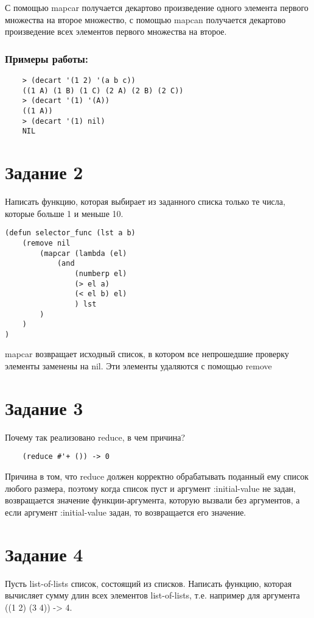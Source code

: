 \documentclass[a4paper, 12pt]{article}
\begin{document}
С помощью mapcar получается декартово произведение одного элемента первого множества на второе множество, с помощью mapcan получается декартово произведение всех элементов первого множества на второе.

\subsubsection*{Примеры работы:}
\begin{lstlisting}
	> (decart '(1 2) '(a b c))
	((1 A) (1 B) (1 C) (2 A) (2 B) (2 C))
	> (decart '(1) '(A))
	((1 A))
	> (decart '(1) nil)
	NIL
\end{lstlisting}


\section*{Задание 2}
Написать функцию, которая выбирает из заданного списка только те числа, которые больше 1 и меньше 10.

\begin{lstlisting}
(defun selector_func (lst a b)
	(remove nil 
		(mapcar (lambda (el) 
			(and 
				(numberp el) 
				(> el a) 
				(< el b) el)
				) lst
		)
	)
)

\end{lstlisting}
mapcar возвращает исходный список, в котором все непрошедшие проверку элементы заменены на nil. Эти элементы удаляются с помощью remove


\section*{Задание 3}
Почему так реализовано reduce, в чем причина?
\begin{lstlisting}
	(reduce #'+ ()) -> 0
\end{lstlisting}

Причина в том, что reduce должен корректно обрабатывать поданный ему список любого размера, поэтому когда список пуст и аргумент :initial-value не задан,  возвращается значение функции-аргумента, которую вызвали без аргументов, а если аргумент :initial-value задан, то возвращается его значение.




\section*{Задание 4}
Пусть list-of-lists список, состоящий из списков. Написать функцию, которая вычисляет сумму длин всех элементов list-of-lists, т.е. например для аргумента ((1 2) (3 4)) -> 4.
\end{document}
